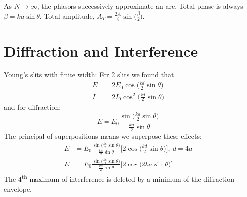 \documentclass[a4paper, 11pt, normalem]{report}
\begin{document}
As $N \rightarrow \infty$, the phasors successively approximate an arc.
Total phase is always $\beta = ka\sin{\theta}$.
Total amplitude, $A_{T} = \frac{2A}{\beta}\sin{\Big(\frac{\beta}{2}\Big)}$.

\section{Diffraction and Interference}
Young's slits with finite width:
For 2 slits we found that
\begin{align}
    E &= 2E_{0}\cos{\Big(\frac{kd}{2}\sin{\theta}\Big)} \\
    I &= 2I_{0}\cos^{2}{\Big(\frac{kd}{2}\sin{\theta}\Big)}
\end{align}
and for diffraction:
\begin{equation}
    E = E_{0}\frac{\sin{\big(\tfrac{ka}{2}\sin{\theta}\big)}}{\tfrac{ka}{2}\sin{\theta}}
\end{equation}
The principal of superpositions means we superpose these effects:
\begin{align}
    E &= E_{0}\frac{\sin{\big(\tfrac{ka}{2}\sin{\theta}\big)}}{\tfrac{ka}{2}\sin{\theta}}\Big[2\cos{\Big(\frac{kd}{2}\sin{\theta}\Big)}\Big],~d = 4a \\
    E &= E_{0}\frac{\sin{\big(\tfrac{ka}{2}\sin{\theta}\big)}}{\tfrac{ka}{2}\sin{\theta}}\Big[2\cos{\Big(2ka\sin{\theta}\Big)}\Big]
\end{align}
The 4\textsuperscript{th} maximum of interference is deleted by a minimum of the diffraction envelope.
\end{document}
